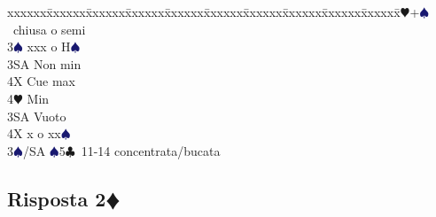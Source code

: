 \documentclass[a4paper,italian]{article}
\newcommand{\BC}{\textcolor{OliveGreen}{$\clubsuit$}}
\newcommand{\BD}{\textcolor{RedOrange}{$\vardiamondsuit$}}
\newcommand{\BH}{\textcolor{Red2}{$\varheartsuit${}}}
\newcommand{\BS}{\textcolor{MidnightBlue}{$\spadesuit${}}}
\newcommand{\pdfd}{\texorpdfstring{\BD{}}{D}}
\newenvironment{bidtable}
{\begin{tabbing}

    xxxxxx\=xxxxxx\=xxxxxx\=xxxxxx\=xxxxxx\=xxxxxx\=xxxxxx\=xxxxxx\=xxxxxx\=xxxxxx\=\kill}
{\end{tabbing} }%
\begin{document}
\begin{multicols}{2}
\begin{bidtable}
        3\BH {}+\BS\ chiusa o semi\+\\
        3\BS \> xxx o H\BS \+\\
        3SA \> Non min\\
        4X \> Cue max\\
        4\BH \> Min\-\\
        3SA \> Vuoto\\
        4X \> x o xx\BS \-\\
        3\BS/SA \BS 5\BC\ 11-14 concentrata/bucata
    \end{bidtable}
\end{multicols}

\newpage

\subsection{Risposta 2\pdfd}
\end{document}
